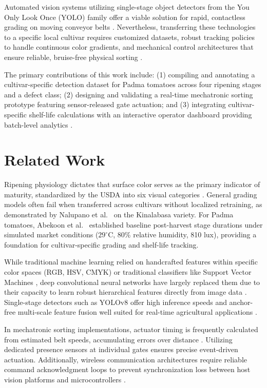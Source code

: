 \documentclass[conference,pageno]{IEEEtran}
\begin{document}
Automated vision systems utilizing single-stage object detectors from the You Only Look Once (YOLO) family offer a viable solution for rapid, contactless grading on moving conveyor belts \cite{redmon2016, terven2023}. Nevertheless, transferring these technologies to a specific local cultivar requires customized datasets, robust tracking policies to handle continuous color gradients, and mechanical control architectures that ensure reliable, bruise-free physical sorting \cite{moya2025}.

The primary contributions of this work include: (1) compiling and annotating a cultivar-specific detection dataset for Padma tomatoes across four ripening stages and a defect class; (2) designing and validating a real-time mechatronic sorting prototype featuring sensor-released gate actuation; and (3) integrating cultivar-specific shelf-life calculations with an interactive operator dashboard providing batch-level analytics \cite{geetha2025}.

\section{Related Work}
Ripening physiology dictates that surface color serves as the primary indicator of maturity, standardized by the USDA into six visual categories \cite{usda1991}. General grading models often fail when transferred across cultivars without localized retraining, as demonstrated by Nalupano et al.~\cite{nalupano2024} on the Kinalabasa variety. For Padma tomatoes, Abekoon et al.~\cite{abekoon2024} established baseline post-harvest stage durations under simulated market conditions ($29^\circ\text{C}$, 80\% relative humidity, 810 lux), providing a foundation for cultivar-specific grading and shelf-life tracking.

While traditional machine learning relied on handcrafted features within specific color spaces (RGB, HSV, CMYK) \cite{santoso2024} or traditional classifiers like Support Vector Machines \cite{liu2019}, deep convolutional neural networks have largely replaced them due to their capacity to learn robust hierarchical features directly from image data \cite{allo2025, centino2025}. Single-stage detectors such as YOLOv8 offer high inference speeds and anchor-free multi-scale feature fusion well suited for real-time agricultural applications \cite{yang2025, fan2026, terven2023}. 

In mechatronic sorting implementations, actuator timing is frequently calculated from estimated belt speeds, accumulating errors over distance \cite{moya2025}. Utilizing dedicated presence sensors at individual gates ensures precise event-driven actuation. Additionally, wireless communication architectures require reliable command acknowledgment loops to prevent synchronization loss between host vision platforms and microcontrollers \cite{saxena2025}.
\end{document}
